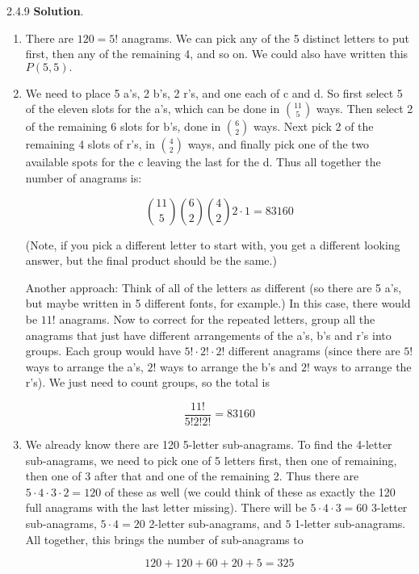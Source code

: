 \documentclass[11pt,]{book}
\theoremstyle{ptxplainnotitle}
\theoremstyle{ptxplaintitle}
\theoremstyle{ptxdefinitionnotitle}
\theoremstyle{ptxdefinitiontitle}
\theoremstyle{ptxdefinitionnotitle}
\theoremstyle{ptxdefinitiontitle}
\theoremstyle{ptxdefinitionnotitle}
\theoremstyle{ptxdefinitiontitle}
\theoremstyle{ptxdefinitiontitlenonumber}
\theoremstyle{ptxdefinitiontitlenonumber}
\numberwithin{equation}{chapter}
\begin{document}
\begin{divisionexercise}{2.4.9}
\textbf{Solution}.\quad%
\hypertarget{p-1575}{}%
\leavevmode%
\begin{enumerate}[label=\alph*.]
\item\hypertarget{li-660}{}\hypertarget{p-1576}{}%
There are \(120 = 5!\) anagrams.  We can pick any of the 5 distinct letters to put first, then any of the remaining 4, and so on.  We could also have written this \(P(5,5)\text{.}\)%
\item\hypertarget{li-661}{}\hypertarget{p-1577}{}%
We need to place 5 a's, 2 b's, 2 r's, and one each of c and d.  So first select 5 of the eleven slots for the a's, which can be done in \({11 \choose 5}\) ways.  Then select 2 of the remaining 6 slots for b's, done in \({6 \choose 2}\) ways.  Next pick 2 of the remaining 4 slots of r's, in \({4 \choose 2}\) ways, and finally pick one of the two available spots for the c leaving the last for the d.  Thus all together the number of anagrams is:%
\par
\hypertarget{p-1578}{}%
%
\begin{equation*}
{11\choose 5}{6 \choose 2}{4 \choose 2}2\cdot 1 = 83160
\end{equation*}
%
\par
\hypertarget{p-1579}{}%
(Note, if you pick a different letter to start with, you get a different looking answer, but the final product should be the same.)%
\par
\hypertarget{p-1580}{}%
Another approach: Think of all of the letters as different (so there are 5 a's, but maybe written in 5 different fonts, for example.)  In this case, there would be \(11!\) anagrams.  Now to correct for the repeated letters, group all the anagrams that just have different arrangements of the a's, b's and r's into groups.  Each group would have \(5!\cdot 2! \cdot 2!\) different anagrams (since there are \(5!\) ways to arrange the a's, \(2!\) ways to arrange the b's and \(2!\) ways to arrange the r's).  We just need to count groups, so the total is%
\par
\hypertarget{p-1581}{}%
%
\begin{equation*}
\frac{11!}{5!2! 2!} = 83160
\end{equation*}
%
\item\hypertarget{li-662}{}\hypertarget{p-1582}{}%
We already know there are 120 5-letter sub-anagrams.  To find the 4-letter sub-anagrams, we need to pick one of 5 letters first, then one of remaining, then one of 3 after that and one of the remaining 2.  Thus there are \(5\cdot 4 \cdot 3 \cdot 2 = 120\) of these as well (we could think of these as exactly the 120 full anagrams with the last letter missing).  There will be \(5 \cdot 4 \cdot 3 = 60\) 3-letter sub-anagrams, \(5\cdot 4 = 20\) 2-letter sub-anagrams, and \(5\) 1-letter sub-anagrams.  All together, this brings the number of sub-anagrams to%
\par
\hypertarget{p-1583}{}%
%
\begin{equation*}
120 + 120 + 60 + 20 + 5 = 325
\end{equation*}
%
\end{enumerate}
%
\end{divisionexercise}%
\end{document}
